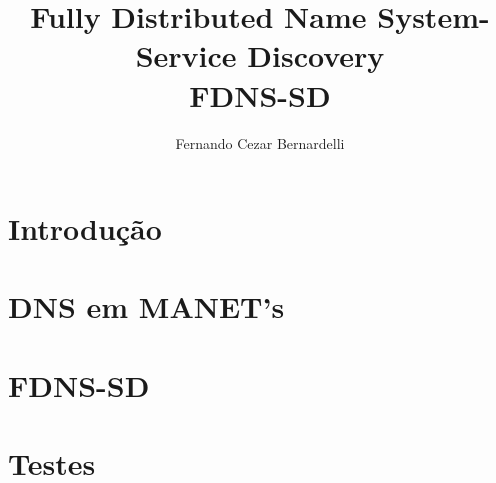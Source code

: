 \documentclass[12pt,a4paper]{style/ufpr}
\title{Fully Distributed Name System-Service Discovery\\FDNS-SD}
\author{Fernando Cezar Bernardelli}
\date{}
\begin{document}
\renewcommand{\thesection}{\arabic{section}} 
\makecapaproposta

\tableofcontents

\begin{abstract}
\end{abstract}

\section{Introdução}


\section{DNS em MANET's}


\section{FDNS-SD}


\section{Testes}


\newpage


\end{document}
